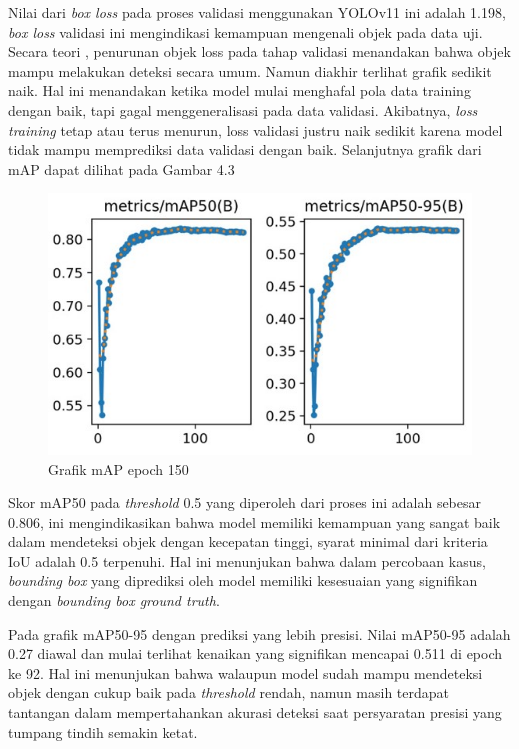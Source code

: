 Nilai dari \emph{box loss} pada proses validasi menggunakan YOLOv11 ini adalah 1.198,
\emph{box loss} validasi ini mengindikasi kemampuan mengenali objek pada data uji. Secara teori
, penurunan objek loss pada tahap validasi menandakan bahwa objek mampu melakukan deteksi
secara umum. Namun diakhir terlihat grafik sedikit naik. Hal ini menandakan ketika model
mulai menghafal pola data training dengan baik, tapi gagal menggeneralisasi pada data validasi.
Akibatnya, \emph{loss training} tetap atau terus menurun, loss validasi justru naik sedikit karena
model tidak mampu memprediksi data validasi dengan baik. Selanjutnya grafik dari mAP dapat dilihat
pada Gambar 4.3
\begin{figure} [H] \centering
  \includegraphics[scale=0.63]{gambar/map grafik yolov11.jpg}
  \caption{Grafik mAP epoch 150}
  \label{fig:Pengujian Performa}
\end{figure}
Skor mAP50 pada \emph{threshold} 0.5 yang diperoleh dari proses ini adalah sebesar 0.806, ini mengindikasikan
bahwa model memiliki kemampuan yang sangat baik dalam mendeteksi objek dengan kecepatan tinggi,
syarat minimal dari kriteria IoU adalah 0.5 terpenuhi. Hal ini menunjukan bahwa dalam percobaan kasus, \emph{bounding box}
yang diprediksi oleh model memiliki kesesuaian yang signifikan dengan \emph{bounding box ground truth}. 

Pada grafik mAP50-95 dengan prediksi yang lebih presisi. Nilai mAP50-95 adalah 0.27 diawal dan mulai terlihat kenaikan yang 
signifikan mencapai 0.511 di epoch ke 92. Hal ini menunjukan bahwa walaupun model sudah mampu mendeteksi objek dengan cukup
baik pada \emph{threshold} rendah, namun masih terdapat tantangan dalam mempertahankan akurasi deteksi
saat persyaratan presisi yang tumpang tindih semakin ketat.

